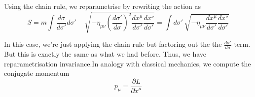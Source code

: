 Using the chain rule, we reparametrise by rewriting the action as 
\[ 
S = m \int \frac{d \sigma}{ d \sigma' } d\sigma' \, \quad \sqrt{  - \eta_{ \mu\nu} \left( \frac{ d \sigma' }{ d\sigma} \right)^2 \frac{ dx^\mu}{ d \sigma' } \frac{ dx^\nu}{ d \sigma' } } = \int d \sigma'\,  \sqrt{  - \eta_{ \mu\nu} \frac{ d x^\mu}{ d \sigma'} \frac{ dx^\nu}{ d\sigma'} } \] 

In this case, we're just applying the chain rule but factoring out the the $\frac{ d \sigma ' }{ d \sigma} $ term. But this is exactly the same as what we had before. Thus, we have reparametrisation invariance.In analogy with classical mechanics, we compute the conjugate momentum \[ 
p_\mu = \frac{ \partial L }{ \partial \dot{x}^\mu }  
\] 


\pagebreak 
